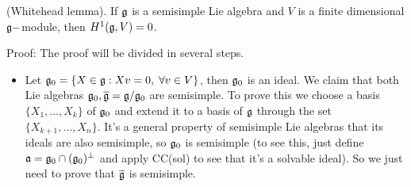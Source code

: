 \begin{dang}
    \begin{theorem}
        (Whitehead lemma). If $\mathfrak{g}$ is a semisimple Lie algebra and $V$ is a finite dimensional $\mathfrak{g}-$module, then 
        $H^1(\mathfrak{g},V)=0$.
    \end{theorem}
\end{dang}
Proof: The proof will be divided in several steps. 
\begin{itemize}
    \item[1.] Let $\mathfrak{g}_0=\{X\in\mathfrak{g}:Xv=0,\;\forall v\in V\}$, then $\mathfrak{g}_0$ is an ideal. We claim that both 
    Lie algebras $\mathfrak{g}_0, \overline{\mathfrak{g}}=\mathfrak{g}/\mathfrak{g}_0$ are semisimple. To prove this we choose a basis 
    $\{X_1,\dots,X_k\}$ of $\mathfrak{g}_0$ and extend it to a basis of $\mathfrak{g}$ through the set $\{X_{k+1},\dots,X_n\}$. 
    It's a general property of semisimple Lie algebras that its ideals are also semisimple, so $\mathfrak{g}_0$ is semisimple 
    (to see this, just define $\mathfrak{a}=\mathfrak{g}_0\cap(\mathfrak{g}_0)^\perp$ and apply CC(sol) to see that it's a solvable ideal).
    So we just need to prove that $\overline{\mathfrak{g}}$ is semisimple.\par 
    

\end{itemize}
